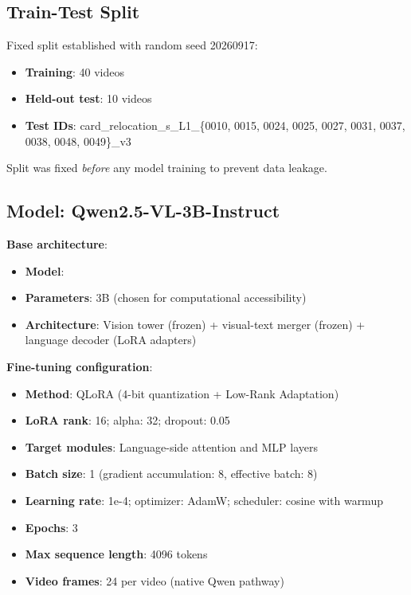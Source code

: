 \subsection{Train-Test Split}

Fixed split established with random seed 20260917:
\begin{itemize}
    \item \textbf{Training}: 40 videos
    \item \textbf{Held-out test}: 10 videos
    \item \textbf{Test IDs}: card\_relocation\_s\_L1\_\{0010, 0015, 0024, 0025, 0027, 0031, 0037, 0038, 0048, 0049\}\_v3
\end{itemize}

Split was fixed \emph{before} any model training to prevent data leakage.

\subsection{Model: Qwen2.5-VL-3B-Instruct}

\textbf{Base architecture}:
\begin{itemize}
    \item \textbf{Model}: 
    \item \textbf{Parameters}: 3B (chosen for computational accessibility)
    \item \textbf{Architecture}: Vision tower (frozen) + visual-text merger (frozen) + language decoder (LoRA adapters)
\end{itemize}

\textbf{Fine-tuning configuration}:
\begin{itemize}
    \item \textbf{Method}: QLoRA (4-bit quantization + Low-Rank Adaptation)
    \item \textbf{LoRA rank}: 16; alpha: 32; dropout: 0.05
    \item \textbf{Target modules}: Language-side attention and MLP layers
    \item \textbf{Batch size}: 1 (gradient accumulation: 8, effective batch: 8)
    \item \textbf{Learning rate}: 1e-4; optimizer: AdamW; scheduler: cosine with warmup
    \item \textbf{Epochs}: 3
    \item \textbf{Max sequence length}: 4096 tokens
    \item \textbf{Video frames}: 24 per video (native Qwen pathway)
\end{itemize}

